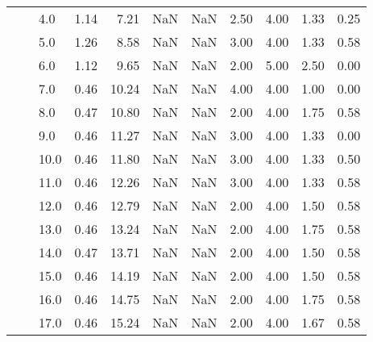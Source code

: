 \begin{tabular}{lllrrrrrrrr}
       &     & 4.0  &      1.14 &       7.21 &               NaN &                NaN & 2.50 &   4.00 &             1.33 &                         0.25 \\
       &     & 5.0  &      1.26 &       8.58 &               NaN &                NaN & 3.00 &   4.00 &             1.33 &                         0.58 \\
       &     & 6.0  &      1.12 &       9.65 &               NaN &                NaN & 2.00 &   5.00 &             2.50 &                         0.00 \\
       &     & 7.0  &      0.46 &      10.24 &               NaN &                NaN & 4.00 &   4.00 &             1.00 &                         0.00 \\
       &     & 8.0  &      0.47 &      10.80 &               NaN &                NaN & 2.00 &   4.00 &             1.75 &                         0.58 \\
       &     & 9.0  &      0.46 &      11.27 &               NaN &                NaN & 3.00 &   4.00 &             1.33 &                         0.00 \\
       &     & 10.0 &      0.46 &      11.80 &               NaN &                NaN & 3.00 &   4.00 &             1.33 &                         0.50 \\
       &     & 11.0 &      0.46 &      12.26 &               NaN &                NaN & 3.00 &   4.00 &             1.33 &                         0.58 \\
       &     & 12.0 &      0.46 &      12.79 &               NaN &                NaN & 2.00 &   4.00 &             1.50 &                         0.58 \\
       &     & 13.0 &      0.46 &      13.24 &               NaN &                NaN & 2.00 &   4.00 &             1.75 &                         0.58 \\
       &     & 14.0 &      0.47 &      13.71 &               NaN &                NaN & 2.00 &   4.00 &             1.50 &                         0.58 \\
       &     & 15.0 &      0.46 &      14.19 &               NaN &                NaN & 2.00 &   4.00 &             1.50 &                         0.58 \\
       &     & 16.0 &      0.46 &      14.75 &               NaN &                NaN & 2.00 &   4.00 &             1.75 &                         0.58 \\
       &     & 17.0 &      0.46 &      15.24 &               NaN &                NaN & 2.00 &   4.00 &             1.67 &                         0.58 \\

\end{tabular}
